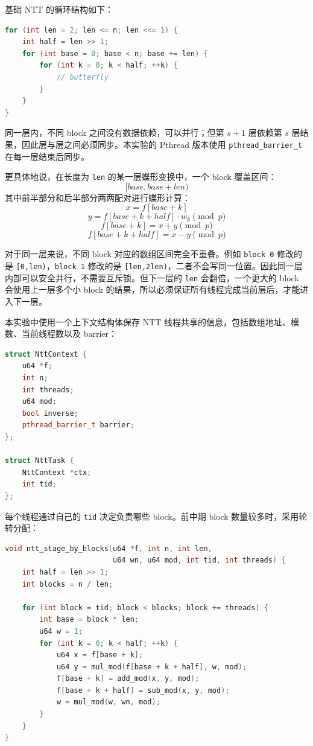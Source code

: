 \documentclass[a4paper]{article}
\begin{document}
基础 NTT 的循环结构如下：

\begin{lstlisting}[title=NTT 蝶形循环结构,frame=trbl,language={C++}]
for (int len = 2; len <= n; len <<= 1) {
    int half = len >> 1;
    for (int base = 0; base < n; base += len) {
        for (int k = 0; k < half; ++k) {
            // butterfly
        }
    }
}
\end{lstlisting}

同一层内，不同 block 之间没有数据依赖，可以并行；但第 $s+1$ 层依赖第 $s$ 层结果，因此层与层之间必须同步。本实验的 Pthread 版本使用 \texttt{pthread\_barrier\_t} 在每一层结束后同步。

更具体地说，在长度为 \texttt{len} 的某一层蝶形变换中，一个 block 覆盖区间：
\[
[base, base+len)
\]
其中前半部分和后半部分两两配对进行蝶形计算：
\[
x=f[base+k]
\]
\[
y=f[base+k+half]\cdot w_k\pmod p
\]
\[
f[base+k]=x+y\pmod p
\]
\[
f[base+k+half]=x-y\pmod p
\]

对于同一层来说，不同 block 对应的数组区间完全不重叠。例如 \texttt{block 0} 修改的是 \texttt{[0,len)}，\texttt{block 1} 修改的是 \texttt{[len,2len)}，二者不会写同一位置。因此同一层内部可以安全并行，不需要互斥锁。但下一层的 \texttt{len} 会翻倍，一个更大的 block 会使用上一层多个小 block 的结果，所以必须保证所有线程完成当前层后，才能进入下一层。

本实验中使用一个上下文结构体保存 NTT 线程共享的信息，包括数组地址、模数、当前线程数以及 barrier：

\begin{lstlisting}[title=NTT 线程共享上下文,frame=trbl,language={C++}]
struct NttContext {
    u64 *f;
    int n;
    int threads;
    u64 mod;
    bool inverse;
    pthread_barrier_t barrier;
};

struct NttTask {
    NttContext *ctx;
    int tid;
};
\end{lstlisting}

每个线程通过自己的 \texttt{tid} 决定负责哪些 block。前中期 block 数量较多时，采用轮转分配：

\begin{lstlisting}[title=按 block 轮转分配蝶形块,frame=trbl,language={C++}]
void ntt_stage_by_blocks(u64 *f, int n, int len,
                         u64 wn, u64 mod, int tid, int threads) {
    int half = len >> 1;
    int blocks = n / len;

    for (int block = tid; block < blocks; block += threads) {
        int base = block * len;
        u64 w = 1;
        for (int k = 0; k < half; ++k) {
            u64 x = f[base + k];
            u64 y = mul_mod(f[base + k + half], w, mod);
            f[base + k] = add_mod(x, y, mod);
            f[base + k + half] = sub_mod(x, y, mod);
            w = mul_mod(w, wn, mod);
        }
    }
}
\end{lstlisting}
\end{document}
